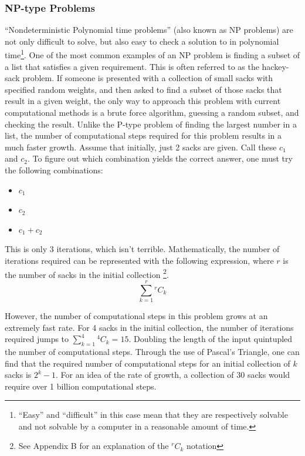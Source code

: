 \documentclass[10pt,journal,compsoc]{IEEEtran}
\newcommand*{\Comb}[2]{{}^{#1}C_{#2}}%
\begin{document}
\subsubsection{NP-type Problems}
 ``Nondeterministic Polynomial time problems'' (also known as NP problems) are not only difficult to solve, but also easy to check a solution to in polynomial time\footnote{``Easy'' and ``difficult'' in this case mean that they are respectively solvable and not solvable by a computer in a reasonable amount of time.}. One of the most common examples of an NP problem is finding a subset of a list that satisfies a given requirement. This is often referred to as the hackey-sack problem. If someone is presented with a collection of small sacks with specified random weights, and then asked to find a subset of those sacks that result in a given weight, the only way to approach this problem with current computational methods is a brute force algorithm, guessing a random subset, and checking the result. Unlike the P-type problem of finding the largest number in a list, the number of computational steps required for this problem results in a much faster growth. Assume that initially, just 2 sacks are given. Call these $c_1$ and $c_2$. To figure out which combination yields the correct answer, one must try the following combinations:
\begin{itemize}
	\item $c_1$
	\item $c_2$
	\item $c_1+c_2$
\end{itemize}
This is only 3 iterations, which isn't terrible. Mathematically, the number of iterations required can be represented with the following expression, where $r$ is the number of sacks in the initial collection \footnote{See Appendix B for an explanation of the $\Comb{r}{k}$ notation}. $$\sum_{k=1}^{r} \Comb{r}{k}$$ 

However, the number of computational steps in this problem grows at an extremely fast rate. For 4 sacks in the initial collection, the number of iterations required jumps to $\sum_{k=1}^{4} \Comb{4}{k} = 15$. Doubling the length of the input quintupled the number of computational steps. Through the use of Pascal's Triangle, one can find that the required number of computational steps for an initial collection of $k$ sacks is $2^k-1$. For an idea of the rate of growth, a collection of 30 sacks would require over 1 billion computational steps. \\
\end{document}
